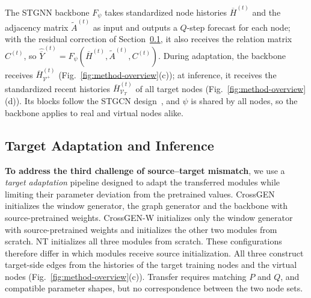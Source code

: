 \documentclass[runningheads,a4paper]{llncs}
\begin{document}
The STGNN backbone $F_\psi$ takes standardized node histories $\overline H^{(t)}$ and the adjacency matrix $\tilde A^{(t)}$ as input and outputs a $Q$-step forecast for each node; with the residual correction of Section~\ref{sec:target-adaptation}, it also receives the relation matrix $C^{(t)}$, so $\widehat{\overline Y}^{(t)}=F_\psi(\overline H^{(t)},\tilde A^{(t)},C^{(t)})$. During adaptation, the backbone receives $\overline H_{\mathcal V^{+}}^{(t)}$ (Fig.~\ref{fig:method-overview}(c)); at inference, it receives the standardized recent histories $\overline H_{\mathcal V_T}^{(t)}$ of all target nodes (Fig.~\ref{fig:method-overview}(d)). Its blocks follow the STGCN design~\cite{stgcn}, and $\psi$ is shared by all nodes, so the backbone applies to real and virtual nodes alike.

\subsection{Target Adaptation and Inference}
\label{sec:target-adaptation}
\label{sec:optimization-inference}

\textbf{To address the third challenge of source--target mismatch}, we use a \emph{target adaptation} pipeline designed to adapt the transferred modules while limiting their parameter deviation from the pretrained values. CrossGEN initializes the window generator, the graph generator and the backbone with source-pretrained weights. CrossGEN-W initializes only the window generator with source-pretrained weights and initializes the other two modules from scratch. NT initializes all three modules from scratch. These configurations therefore differ in which modules receive source initialization. All three construct target-side edges from the histories of the target training nodes and the virtual nodes (Fig.~\ref{fig:method-overview}(c)). Transfer requires matching $P$ and $Q$, and compatible parameter shapes, but no correspondence between the two node sets.
\end{document}
